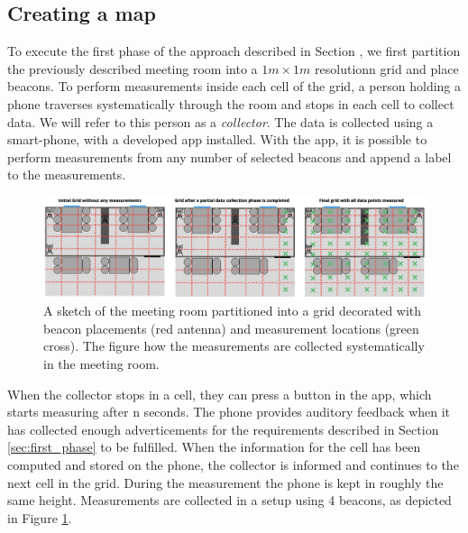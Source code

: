\subsection{Creating a map}
To execute the first phase of the approach described in Section \label{sec:first_phase}, we first partition the previously described meeting room into a $1m \times 1m$ resolutionn grid and place beacons.
To perform measurements inside each cell of the grid, a person holding a phone traverses systematically through the room and stops in each cell to collect data. 
We will refer to this person as a \textit{collector}.
The data is collected using a smart-phone, with a developed app installed.   
With the app, it is possible to perform measurements from any number of selected beacons and append a label to the measurements.
\begin{figure}[h]
    \centering
    \includegraphics[scale=0.7]{images/experiment_map_creation.png}
    \caption{A sketch of the meeting room partitioned into a grid decorated with beacon placements (red antenna) and measurement locations (green cross). The figure how the measurements are collected systematically in the meeting room.}
    \label{fig:experiment_map_creation}
\end{figure}

When the collector stops in a cell, they can press a button in the app, which starts measuring after n seconds. 
The phone provides auditory feedback when it has collected enough adverticements for the requirements described in Section \ref{sec:first_phase} to be fulfilled.
When the information for the cell has been computed and stored on the phone, the collector is informed and continues to the next cell in the grid. 
During the measurement the phone is kept in roughly the same height.
Measurements are collected in a setup using 4 beacons, as depicted in Figure \ref{fig:experiment_map_creation}.

